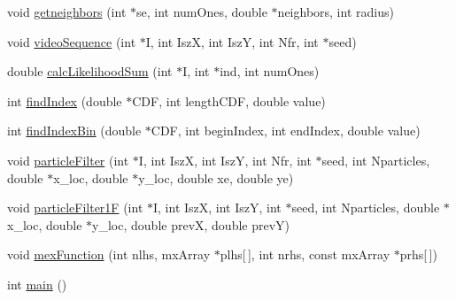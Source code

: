\begin{DoxyCompactItemize}
\item 
void \hyperlink{ex__particle__CUDA__naive_8cu_a2a8357e06057d48a030afcb481081349}{getneighbors} (int $\ast$se, int numOnes, double $\ast$neighbors, int radius)
\item 
void \hyperlink{ex__particle__CUDA__naive_8cu_a2925e128f88b60e0904210704e5ff7f5}{videoSequence} (int $\ast$I, int IszX, int IszY, int Nfr, int $\ast$seed)
\item 
double \hyperlink{ex__particle__CUDA__naive_8cu_a875b89dec232da58dee8863b7d673808}{calcLikelihoodSum} (int $\ast$I, int $\ast$ind, int numOnes)
\item 
int \hyperlink{ex__particle__CUDA__naive_8cu_a71e946a9752dba5f8f3def41e58a8469}{findIndex} (double $\ast$CDF, int lengthCDF, double value)
\item 
int \hyperlink{ex__particle__CUDA__naive_8cu_a0952c4d9efa944180ca6deb470239fba}{findIndexBin} (double $\ast$CDF, int beginIndex, int endIndex, double value)
\item 
void \hyperlink{ex__particle__CUDA__naive_8cu_a31746ff3055946c596437a94b1e7fcd9}{particleFilter} (int $\ast$I, int IszX, int IszY, int Nfr, int $\ast$seed, int Nparticles, double $\ast$x\_\-loc, double $\ast$y\_\-loc, double xe, double ye)
\item 
void \hyperlink{ex__particle__CUDA__naive_8cu_a81e883a19beb30fd4ebe47acb98dbd0d}{particleFilter1F} (int $\ast$I, int IszX, int IszY, int $\ast$seed, int Nparticles, double $\ast$x\_\-loc, double $\ast$y\_\-loc, double prevX, double prevY)
\item 
void \hyperlink{ex__particle__CUDA__naive_8cu_a6a215cbfde54f82a3ce599228fc3fce5}{mexFunction} (int nlhs, mxArray $\ast$plhs\mbox{[}$\,$\mbox{]}, int nrhs, const mxArray $\ast$prhs\mbox{[}$\,$\mbox{]})
\item 
int \hyperlink{ex__particle__CUDA__naive_8cu_ae66f6b31b5ad750f1fe042a706a4e3d4}{main} ()
\end{DoxyCompactItemize}
